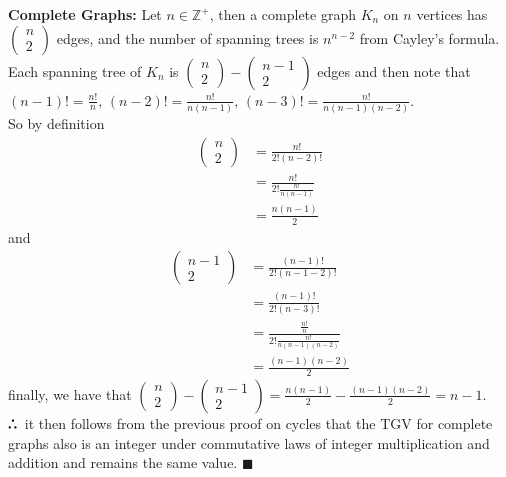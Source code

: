 \documentclass{article}
\def\therefore{\boldsymbol{\text{ }
\leavevmode
\lower0.4ex\hbox{$\cdot$}
\kern-.5em\raise0.7ex\hbox{$\cdot$}
\kern-0.55em\lower0.4ex\hbox{$\cdot$}
\thinspace\text{ }}}
\begin{document}
\textbf{Complete Graphs:}
Let $n\in\mathbb{Z}^{+}$, then a complete graph $K_{n}$ on $n$ vertices has 
$\begin{pmatrix}
n\\
2
\end{pmatrix}$
edges, and the number of spanning trees is $n^{n-2}$ from Cayley's formula. Each spanning tree of $K_{n}$ is
$\begin{pmatrix}
n\\
2
\end{pmatrix}
-
\begin{pmatrix}
n-1\\
2
\end{pmatrix}$
edges and then note that\\ $(n-1)!=\frac{n!}{n},\,(n-2)!=\frac{n!}{n(n-1)},\,(n-3)!=\frac{n!}{n(n-1)(n-2)}$.\\
So by definition
\begin{align*}
\begin{pmatrix}
n\\
2
\end{pmatrix}&=\frac{n!}{2!(n-2)!}\\
&=\frac{n!}{2!\frac{n!}{n(n-1)}}\\
&=\frac{n(n-1)}{2}
\end{align*} and
\begin{align*}
\begin{pmatrix}
n-1\\
2
\end{pmatrix}&=\frac{(n-1)!}{2!(n-1-2)!}\\
&=\frac{(n-1)!}{2!(n-3)!}\\
&=\frac{\frac{n!}{n}}{2!\frac{n!}{n(n-1)(n-2)}}\\
&=\frac{(n-1)(n-2)}{2}
\end{align*}
finally, we have that
$\begin{pmatrix}
n\\
2
\end{pmatrix}
-
\begin{pmatrix}
n-1\\
2
\end{pmatrix}
=\frac{n(n-1)}{2}-\frac{(n-1)(n-2)}{2}=n-1$.\\
$\therefore$ it then follows from the previous proof on cycles that the TGV for complete graphs also is an integer under commutative laws of integer multiplication and addition and remains the same value. $\blacksquare$
\end{document}
